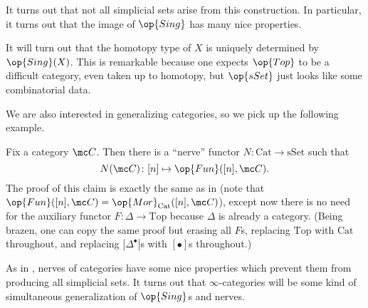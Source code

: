 \documentclass[../notes.tex]{subfiles}
\begin{document}
\begin{remark} \label{rem:more-sset-than-sing}
	It turns out that not all simplicial sets arise from this construction. In particular, it turns out that the image of $\op{Sing}$ has many nice properties. %
\end{remark}
\begin{remark}
	It will turn out that the homotopy type of $X$ is uniquely determined by $\op{Sing}(X)$. This is remarkable because one expects $\op{Top}$ to be a difficult category, even taken up to homotopy, but $\op{sSet}$ just looks like some combinatorial data.
\end{remark}
We are also interested in generalizing categories, so we pick up the following example.
\begin{example}[nerve] \label{ex:nerve}
	Fix a category $\mc C$. Then there is a ``nerve'' functor $N\colon\mathrm{Cat}\to\mathrm{sSet}$ such that
	\[N(\mc C)\colon[n]\mapsto\op{Fun}([n],\mc C).\]
	The proof of this claim is exactly the same as in  (note that $\op{Fun}([n],\mc C)=\op{Mor}_{\mathrm{Cat}}([n],\mc C)$), except now there is no need for the auxiliary functor $F\colon\Delta\to\mathrm{Top}$ because $\Delta$ is already a category. (Being brazen, one can copy the same proof but erasing all $F$s, replacing $\mathrm{Top}$ with $\mathrm{Cat}$ throughout, and replacing $\left|\Delta^\bullet\right|$s with $[\bullet]$s throughout.)%
\end{example}
\begin{remark}
	As in , nerves of categories have some nice properties which prevent them from producing all simplicial sets. It turns out that $\infty$-categories will be some kind of simultaneous generalization of $\op{Sing}$s and nerves.
\end{remark}
\end{document}
